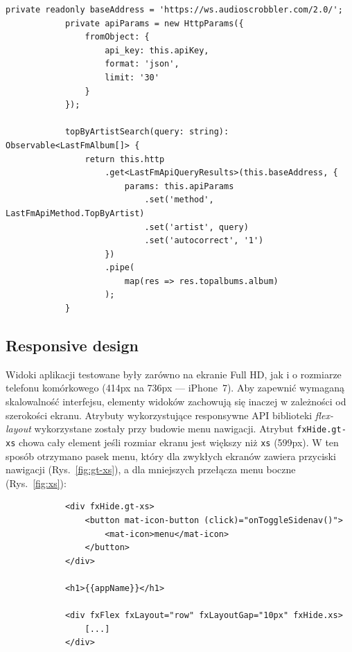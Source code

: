 		\begin{lstlisting}[label=lst:lastfmApi, caption=Metoda wykorzystujaca Api Last.fm, float=h]
			private readonly baseAddress = 'https://ws.audioscrobbler.com/2.0/';
			private apiParams = new HttpParams({
				fromObject: {
					api_key: this.apiKey,
					format: 'json',
					limit: '30'
				}
			});

			topByArtistSearch(query: string): Observable<LastFmAlbum[]> {
				return this.http
					.get<LastFmApiQueryResults>(this.baseAddress, {
						params: this.apiParams
							.set('method', LastFmApiMethod.TopByArtist)
							.set('artist', query)
							.set('autocorrect', '1')
					})
					.pipe(
						map(res => res.topalbums.album)
					);
			}
		\end{lstlisting}

	\subsection{Responsive design}
		Widoki aplikacji testowane były zarówno na ekranie Full HD, jak i o rozmiarze telefonu komórkowego (414px na 736px --- iPhone~7).
		Aby zapewnić wymaganą skalowalność interfejsu, elementy widoków zachowują się inaczej w zależności od szerokości ekranu.
		Atrybuty wykorzystujące responsywne API biblioteki \emph{flex-layout} wykorzystane zostały przy budowie menu nawigacji.
		Atrybut \verb|fxHide.gt-xs| chowa cały element jeśli rozmiar ekranu jest większy niż \verb|xs| (599px).
		W ten sposób otrzymano pasek menu, który dla zwykłych ekranów zawiera przyciski nawigacji (Rys.~\ref{fig:gt-xs}),
		a dla mniejszych przełącza menu boczne (Rys.~\ref{fig:xs}):
		\begin{lstlisting}
			<div fxHide.gt-xs>
				<button mat-icon-button (click)="onToggleSidenav()">
					<mat-icon>menu</mat-icon>
				</button>
			</div>

			<h1>{{appName}}</h1>
		
			<div fxFlex fxLayout="row" fxLayoutGap="10px" fxHide.xs>
				[...]
			</div>
		\end{lstlisting}

